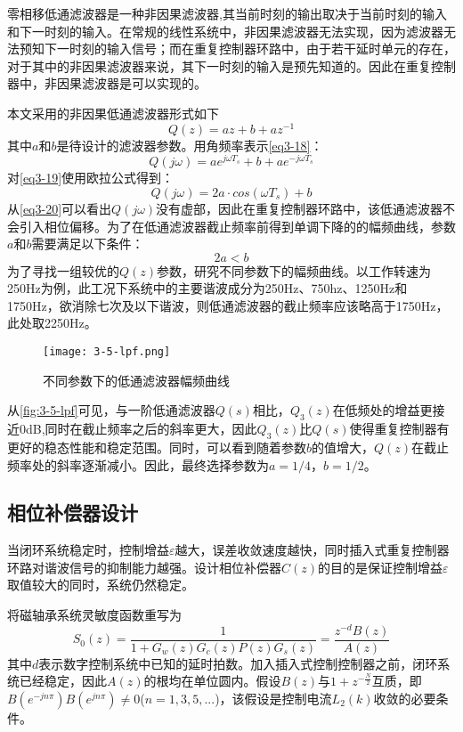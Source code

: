 \documentclass[
  lang=cn,
  degree=master,
  openany,oneside
]{nuaathesis}
\begin{document}
零相移低通滤波器是一种非因果滤波器,其当前时刻的输出取决于当前时刻的输入和下一时刻的输入。在常规的线性系统中，非因果滤波器无法实现，因为滤波器无法预知下一时刻的输入信号；而在重复控制器环路中，由于若干延时单元的存在，对于其中的非因果滤波器来说，其下一时刻的输入是预先知道的。因此在重复控制器中，非因果滤波器是可以实现的。

本文采用的非因果低通滤波器形式如下
\begin{equation}
\label{eq3-18}
Q(z)=az+b+az^{-1}
\end{equation}
其中$a$和$b$是待设计的滤波器参数。用角频率表示\autoref{eq3-18}：
\begin{equation}
\label{eq3-19}
Q(j\omega)=ae^{j\omega T_s}+b+ae^{-j\omega T_s}
\end{equation}
对\autoref{eq3-19}使用欧拉公式得到：
\begin{equation}
\label{eq3-20}
Q(j\omega)=2a\cdot cos(\omega T_s)+b
\end{equation}
从\autoref{eq3-20}可以看出$Q(j\omega)$没有虚部，因此在重复控制器环路中，该低通滤波器不会引入相位偏移。为了在低通滤波器截止频率前得到单调下降的的幅频曲线，参数$a$和$b$需要满足以下条件：
\begin{equation}
\label{eq3-21}
2a<b
\end{equation}
为了寻找一组较优的$Q(z)$参数，研究不同参数下的幅频曲线。以工作转速为250Hz为例，此工况下系统中的主要谐波成分为250Hz、750hz、1250Hz和1750Hz，欲消除七次及以下谐波，则低通滤波器的截止频率应该略高于1750Hz，此处取2250Hz。
\begin{figure}[h!]
	\texttt{[image: 3-5-lpf.png]}
	\caption{不同参数下的低通滤波器幅频曲线}
	\label{fig:3-5-lpf}
\end{figure}

从\autoref{fig:3-5-lpf}可见，与一阶低通滤波器$Q(s)$相比，$Q_3(z)$在低频处的增益更接近0dB,同时在截止频率之后的斜率更大，因此$Q_3(z)$比$Q(s)$使得重复控制器有更好的稳态性能和稳定范围。同时，可以看到随着参数$b$的值增大，$Q(z)$在截止频率处的斜率逐渐减小。因此，最终选择参数为$a=1/4$，$b=1/2$。
\subsection{相位补偿器设计}
当闭环系统稳定时，控制增益$\varepsilon$越大，误差收敛速度越快，同时插入式重复控制器环路对谐波信号的抑制能力越强。设计相位补偿器$C(z)$的目的是保证控制增益$\varepsilon$取值较大的同时，系统仍然稳定。

将磁轴承系统灵敏度函数重写为
\begin{equation}
\label{eq_s0z}
S_0(z)=\frac{1}{1+G_w(z)G_c(z)P(z)G_s(z)}=\frac{z^{-d}B(z)}{A(z)}
\end{equation}
其中$d$表示数字控制系统中已知的延时拍数。加入插入式控制控制器之前，闭环系统已经稳定，因此$A(z)$的根均在单位圆内。假设$B(z)$与$1+z^{-\frac{N}{2}}$互质，即$B(e^{-jn\pi})B(e^{jn\pi})\neq 0$($n=1,3,5,...$)，该假设是控制电流$L_2(k)$收敛的必要条件。
\end{document}
